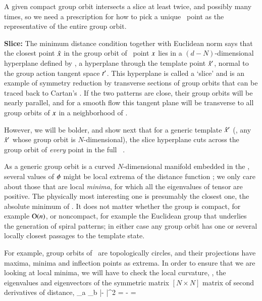 A given compact group orbit intersects a slice at least twice, and
possibly many times, so we need a prescription for how to
pick a unique \reducedsp\ point as the representative of the entire group
orbit.

{\bf Slice:}
The minimum distance condition  together with
Euclidean norm says that the
closest point $\hat{x}$ in the group orbit of \statesp\ point $x$ lies in a
$(d\!-\!N)$-dimensional hyperplane defined by ,
a hyperplane through the template point ${\hat{x}'}$,
normal to the group action tangent
space $t'_{}$.
This hyperplane is called a `slice' and is an example of
symmetry reduction by transverse sections of
group orbits that
can be traced back to Cartan's \mframes{}.
If the two patterns are
close, their group orbits will be nearly parallel, and for a smooth flow
this tangent plane will be transverse to all group orbits of $x$ in a
neighborhood of \slicep.

However, we will be bolder, and show next that for a generic template
${\hat{x}'}$ (\ie, any ${\hat{x}'}$ whose group orbit is $N$-dimensional), the
slice hyperplane  cuts across the group orbit of {\em
every} point in the full \statesp\ \pS.

As a generic group orbit is a curved $N$-dimensional manifold embedded in
the \statesp, several values of ${\bf \phi}$ might be local extrema of the
distance function ; we only care about those that are
local {\em minima}, for which all the eigenvalues of tensor
 are positive. The physically most interesting one is
presumably the closest one, the absolute minimum of .
It does not matter whether the group is compact, for example $\textrm{O}(n)$, or
noncompact, for example the Euclidean group that underlies the generation
of spiral patterns; in either case any group orbit has
one or several locally closest passages to the template state.

For
example, group orbits of \ are topologically circles, and their
projections have maxima, minima and inflection points as extrema.
In order to ensure that we are looking at local minima, we will have to
check the local curvature, \ie, the eigenvalues and eigenvectors of the
symmetric matrix $[N\!\times\!N]$ matrix of second derivatives
of distance,
\beq
{}
     {\partial \gSpace_a \partial \gSpace_b}
        |\sspRed - \slicep|^2
    =
  - =


